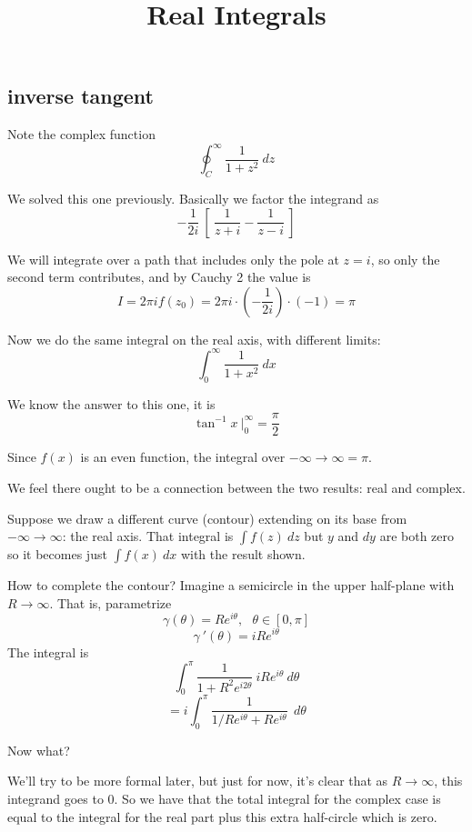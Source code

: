 \documentclass[11pt, oneside]{article}   	%
\title{Real Integrals}
\date{}							%
\begin{document}
\maketitle
\Large

\subsection*{inverse tangent}

Note the complex function
\[ \oint_C^{\infty} \frac{1}{1 + z^2} \ dz \]

We solved this one previously.  Basically we factor the integrand as
\[ - \frac{1}{2i} \ [ \ \frac{1}{z + i} - \frac{1}{z - i} \ ] \]

We will integrate over a path that includes only the pole at $z = i$, so only the second term contributes, and by Cauchy 2 the value is
\[ I = 2 \pi i f(z_0) = 2 \pi i \cdot (- \frac{1}{2i}) \cdot (-1) = \pi \]

Now we do the same integral on the real axis, with different limits:
\[ \int_0^{\infty} \frac{1}{1 + x^2} \ dx \]

We know the answer to this one, it is 
\[ \tan^{-1} x \ \bigg |_0^{\infty} = \frac{\pi}{2}  \]

Since $f(x)$ is an even function, the integral over $-\infty \rightarrow \infty = \pi$.

We feel there ought to be a connection between the two results:  real and complex.

Suppose we draw a different curve (contour) extending on its base from $-\infty \rightarrow \infty$: the real axis.  That integral is $\int f(z) \ dz$ but $y$ and $dy$ are both zero so it becomes just $\int f(x) \ dx$ with the result shown.

How to complete the contour?  Imagine a semicircle in the upper half-plane with $R \rightarrow \infty$.  That is, parametrize
\[ \gamma(\theta) = Re^{i\theta}, \ \ \ \theta \in [0, \pi] \]
\[ \gamma \ '(\theta) =  iRe^{i\theta} \]
The integral is
\[ \int_0^{\pi} \frac{1}{1 + R^2 e^{i2\theta}} \ i R e^{i \theta} \ d \theta \]
\[ = i \int_0^{\pi} \frac{1}{1/Re^{i \theta}  + R e^{i\theta}} \ \ d \theta \]

Now what?

We'll try to be more formal later, but just for now, it's clear that as $R \rightarrow \infty$, this integrand goes to 0.  So we have that the total integral for the complex case is equal to the integral for the real part plus this extra half-circle which is zero.
\end{document}
